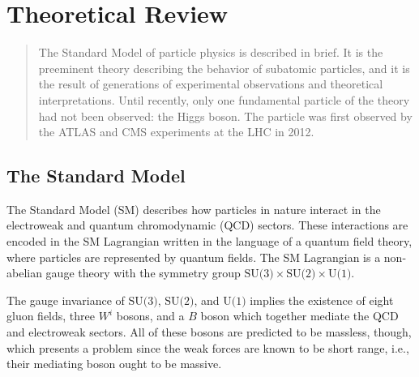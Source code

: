 \chapter[Theoretical Review][Theoretical Review]{Theoretical Review}
\label{chap:standardmodel}

\begin{quote}
  The Standard Model of particle physics is described in brief. It is the preeminent theory describing the behavior of subatomic particles, and it is the result of generations of experimental observations and theoretical interpretations. Until recently, only one fundamental particle of the theory had not been observed: the Higgs boson. The particle was first observed by the ATLAS and CMS experiments at the LHC in 2012.
\end{quote}

\section{The Standard Model}

The Standard Model (SM) describes how particles in nature interact in the electroweak and quantum chromodynamic (QCD) sectors. These interactions are encoded in the SM Lagrangian written in the language of a quantum field theory, where particles are represented by quantum fields. The SM Lagrangian is a non-abelian gauge theory with the symmetry group $\text{SU(3)}\times\text{SU(2)}\times\text{U(1)}$. 


The gauge invariance of $\text{SU(3)}$, $\text{SU(2)}$, and $\text{U(1)}$ implies the existence of eight gluon fields, three $W^i$ bosons, and a $B$ boson which together mediate the QCD and electroweak sectors. All of these bosons are predicted to be massless, though, which presents a problem since the weak forces are known to be short range, i.e., their mediating boson ought to be massive.

